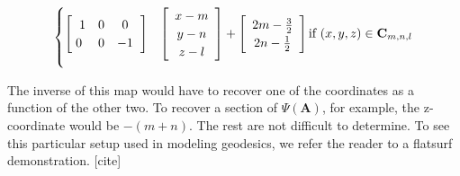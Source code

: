 \documentclass[a4paper, 11pt]{article}
\begin{document}
\begin{equation}
\begin{cases}
		\left[ \begin{matrix} \hspace{2mm}
		1 & 0 & 0 \\
		0 & 0 & -1 
		\end{matrix}\hspace{2mm}\right]
		&\left[\begin{array}{c}
			x - m
			\\ y- n
			\\ z - l
			\end{array} \right]
		+
			\left[\begin{array}{c}
				2m - \frac{3}{2}
				\\ 2n - \frac{1}{2}
			\end{array} \right]
				 \text{if } (x,y,z)\in \mathbf{C}_{m,n,l}	\vspace{2mm}
\end{cases}
\end{equation}

The inverse of this map would have to recover one of the coordinates as a function of the other two. To recover a section of $\Psi(\mathbf{A})$, for example, the z-coordinate would be $-(m+n)$. The rest are not difficult to determine. To see this particular setup used in modeling geodesics, we refer the reader to a flatsurf demonstration. [cite]
\end{document}
